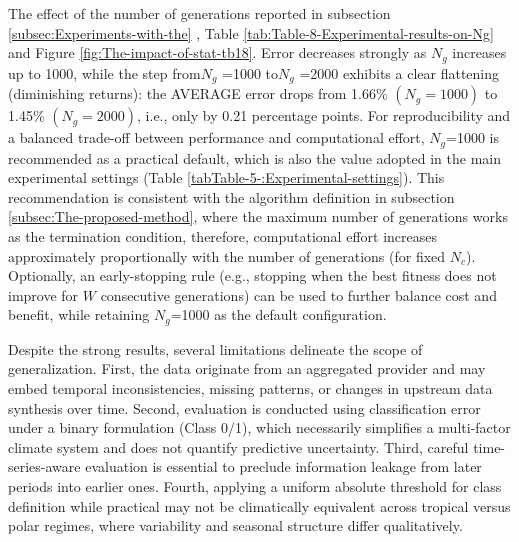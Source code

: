 \documentclass[12pt]{Definitions/academia}
\begin{document}
The effect of the number of generations reported in subsection \ref{subsec:Experiments-with-the}
, Table \ref{tab:Table-8-Experimental-results-on-Ng} and  Figure \ref{fig:The-impact-of-stat-tb18}.
Error decreases strongly as $N_{g}$ increases up to 1000, while the
step from$N_{g}$ =1000 to$N_{g}$ =2000 exhibits a clear flattening
(diminishing returns): the AVERAGE error drops from 1.66\% $\left(N_{g}=1000\right)$
to 1.45\% $\left(N_{g}=2000\right)$, i.e., only by 0.21 percentage
points. For reproducibility and a balanced trade-off between performance
and computational effort, $N_{g}$=1000 is recommended as a practical
default, which is also the value adopted in the main experimental
settings (Table \ref{tabTable-5-:Experimental-settings}). This recommendation
is consistent with the algorithm definition in subsection \ref{subsec:The-proposed-method},
where the maximum number of generations  works as the termination
condition, therefore, computational effort increases approximately
proportionally with the number of generations (for fixed $N_{c}$).
Optionally, an early-stopping rule (e.g., stopping when the best fitness
does not improve for $W$ consecutive generations) can be used to
further balance cost and benefit, while retaining $N_{g}$=1000 as
the default configuration.

Despite the strong results, several limitations delineate the scope
of generalization. First, the data originate from an aggregated provider
and may embed temporal inconsistencies, missing patterns, or changes
in upstream data synthesis over time. Second, evaluation is conducted
using classification error under a binary formulation (Class 0/1),
which necessarily simplifies a multi-factor climate system and does
not quantify predictive uncertainty. Third, careful time-series-aware
evaluation is essential to preclude information leakage from later
periods into earlier ones. Fourth, applying a uniform absolute threshold for class definition while practical may
not be climatically equivalent across tropical versus polar regimes,
where variability and seasonal structure differ qualitatively.
\end{document}
